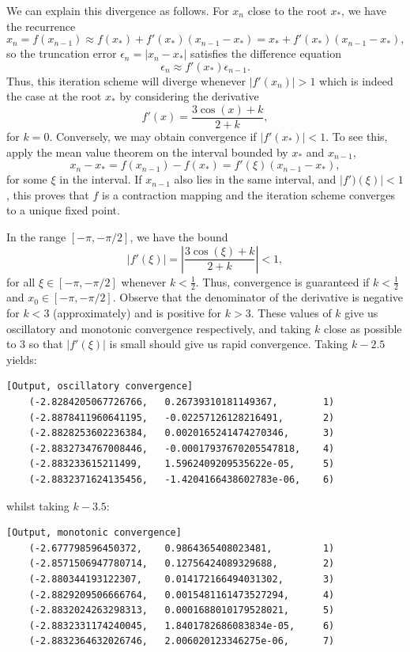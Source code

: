 \documentclass{article}
\begin{document}
We can explain this divergence as follows. For \(x_n\) close to the root \(x_*\), we have the recurrence
\[ x_n = f(x_{n-1}) \approx f(x_*) + f'(x_*)(x_{n-1} - x_*) = x_* + f'(x_*)(x_{n-1} -x_*), \]
so the truncation error \(\epsilon_n = |x_n - x_*|\) satisfies the difference equation
\[ \epsilon_n \approx f'(x_*) \epsilon_{n-1}. \]
Thus, this iteration scheme will diverge whenever \(|f'(x_n)| > 1\) which is indeed the case at the root \(x_*\) by considering the derivative
\[ f'(x) = \frac{3\cos(x) + k}{2 + k}, \]
for \(k = 0\). Conversely, we may obtain convergence if \(|f'(x_*)| < 1\). To see this, apply the mean value theorem on the interval bounded by \(x_*\) and \(x_{n-1}\),
\[ x_n - x_* = f(x_{n-1}) - f(x_*) = f'(\xi)(x_{n-1} -x_*), \]
for some \(\xi\) in the interval. If \(x_{n-1}\) also lies in the same interval, and \(|f')(\xi)| < 1\), this proves that \(f\) is a contraction mapping and the iteration scheme converges to a unique fixed point. 

In the range \([-\pi, -\pi/2]\), we have the bound
\[ |f'(\xi)| = \left|\frac{3\cos(\xi) + k}{2 + k}\right| < 1, \]
for all \(\xi \in [-\pi, -\pi/2]\) whenever \(k < \frac{1}{2}\). Thus, convergence is guaranteed if \(k< \frac{1}{2}\) and \(x_0 \in [-\pi, -\pi/2]\). Observe that the denominator of the derivative is negative for \(k < 3\) (approximately) and is positive for \(k >  3\). These values of \(k\) give us oscillatory and monotonic convergence respectively, and taking \(k\) close as possible to \(3\) so that \(|f'(\xi)|\) is small should give us rapid convergence. Taking \(k - 2.5\) yields:

\begin{verbatim}[Output, oscillatory convergence]
    (-2.8284205067726766,   0.26739310181149367,        1)
    (-2.8878411960641195,   -0.02257126128216491,       2)
    (-2.8828253602236384,   0.0020165241474270346,      3)
    (-2.8832734767008446,   -0.00017937670205547818,    4)
    (-2.883233615211499,    1.5962409209535622e-05,     5)
    (-2.8832371624135456,   -1.4204166438602783e-06,    6)
\end{verbatim}

whilst taking \(k - 3.5\):

\begin{verbatim}[Output, monotonic convergence]
    (-2.677798596450372,    0.9864365408023481,         1)
    (-2.8571506947780714,   0.12756424089329688,        2)
    (-2.880344193122307,    0.014172166494031302,       3)
    (-2.8829209506666764,   0.0015481161473527294,      4)
    (-2.8832024263298313,   0.0001688010179528021,      5)
    (-2.8832331174240045,   1.8401782686083834e-05,     6)
    (-2.8832364632026746,   2.006020123346275e-06,      7)
\end{verbatim}
\end{document}
